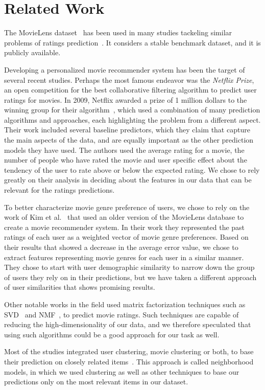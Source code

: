 \section{Related Work}

The MovieLens dataset~\cite{GroupLens,MovieLens} has been used in many studies tackeling similar problems of ratings prediction~\cite{5575081, zhang2006learning}. It considers a stable benchmark dataset, and it is publicly available. 

Developing a personalized movie recommender system has been the target of several recent studies. Perhaps the most famous endeavor was the \textit{Netflix Prize}, an open competition for the best collaborative filtering algorithm to predict user ratings for movies. In 2009, Netflix awarded a prize of 1 million dollars to the winning group for their algorithm~\cite{bell2007bellkor}, which used a combination of many prediction algorithms and approaches, each highlighting the problem from a different aspect. Their work included several baseline predictors, which they claim that capture the main aspects of the data, and are equally important as the other prediction models they have used. The authors used the average rating for a movie, the number of people who have rated the movie and user specific effect about the tendency of the user to rate above or below the expected rating. We chose to rely greatly on their analysis in deciding about the features in our data that can be relevant for the ratings predictions. 

To better characterize movie genre preference of users, we chose to rely on the work of Kim et al.~\cite{5575081} that used an older version of the MovieLens database to create a movie recommender system. In their work they represented the past ratings of each user as a weighted vector of movie genre preferences. Based on their results that showed a decrease in the average error value, we chose to extract features representing movie genres for each user in a similar manner. They chose to start with user demographic similarity to narrow down the group of users they rely on in their predictions, but we have taken a different approach of user similarities that shows promising results. 

Other notable works in the field used matrix factorization techniques such as SVD~\cite{koren2009matrix, zhang2006learning} and NMF~\cite{nguyen2012modified, zhang2006learning}, to predict movie ratings. Such techniques are capable of reducing the high-dimensionality of our data, and we therefore speculated that using such algorithms could be a good approach for our task as well. 

Most of the studies integrated user clustering, movie clustering or both, to  base their prediction on closely related items~\cite{bell2007bellkor, 5575081, kim2012recommender}. This approach is called neighborhood models, in which we used clustering as well as other techniques to base our predictions only on the most relevant items in our dataset.